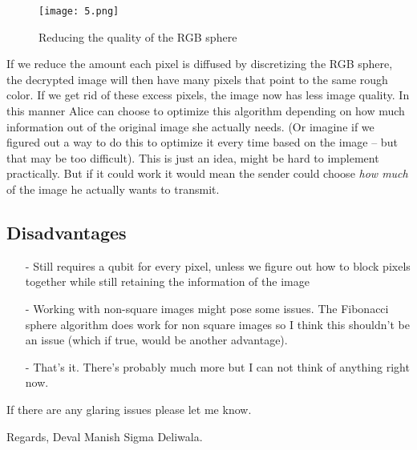 \documentclass[svgnames]{article}     %
\begin{document}
\begin{figure}[H]
  \centering
  \texttt{[image: 5.png]}
  \caption{Reducing the quality of the RGB sphere} 
\end{figure}

If we reduce the amount each pixel is diffused by discretizing the RGB sphere,
the decrypted image will then have many pixels that point to the same rough
color. If we get rid of these excess pixels, the image now has less image
quality. In this manner Alice can choose to optimize this algorithm depending
on how much information out of the original image she actually needs. (Or
imagine if we figured out a way to do this to optimize it every time based on
the image -- but that may be too difficult). This is just an idea, might be
hard to implement practically. But if it could work it would mean the sender
could choose \textit{how much} of the image he actually wants to transmit. 

\subsection{Disadvantages}

\begin{itemize}
  \item[-] Still requires a qubit for every pixel, unless we figure out how to
    block pixels together while still retaining the information of the image
    \item[-] Working with non-square images might pose some issues. The
      Fibonacci sphere algorithm does work for non square images so I think
      this shouldn't be an issue (which if true, would be another advantage). 
  \item[-] That's it. There's probably much more but I can not think of
    anything right now. 
\end{itemize}


If there are any glaring issues please let me know. \\

\vspace{100px} 

Regards, 
Deval Manish Sigma Deliwala.
\end{document}
